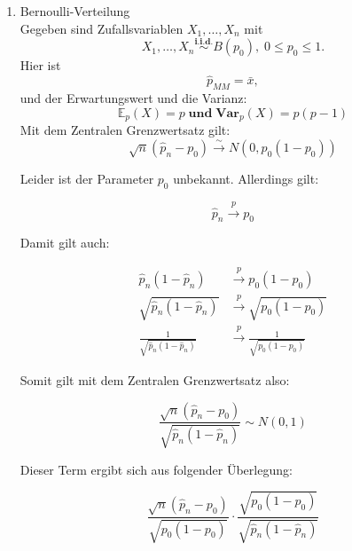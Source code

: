 \documentclass[10pt]{article}
\newcommand{\FZV}{X_1, \ldots, X_n} %
\newcommand{\EW}{\mathbb{E}} %
\newcommand{\KW}{\overset{p} \longrightarrow} %
\newcommand{\KV}{\overset{\sim} \longrightarrow} %
\newenvironment{BSP}[1][]
{\begin{Beispiel}[frametitle=#1]}{\end{Beispiel}}
\begin{document}
	\begin{BSP}[Beispiel 1.3.4 (Schätzfehlerverteilung MM-Schätzer)]
			\begin{enumerate}[label = (\roman*)]
			\item Bernoulli-Verteilung\\
			Gegeben sind Zufallsvariablen $\FZV$ mit
			\begin{equation*}
				\FZV \overset{\textbf{i.i.d.}}{\sim} B(p_0), \; 0 \leq p_0 \leq 1.
			\end{equation*} 
			Hier ist
			\begin{equation*}
				\hat{p}_{MM} = \bar{x},
			\end{equation*}
			und der Erwartungswert und die Varianz:
			\begin{equation*}
				\EW_p(X)=p \; \textbf{und} \; 	\textbf{Var}_p(X) = p(p-1)
			\end{equation*}
			Mit dem Zentralen Grenzwertsatz gilt:
			\begin{equation*}
				\sqrt{n}(\hat{p}_n - p_0) \KV N(0,p_0(1-p_0))
			\end{equation*}
			
			Leider ist der Parameter $p_0$ unbekannt. Allerdings gilt:
			
			\begin{equation*}
				\hat{p}_n \KW p_0
			\end{equation*}
			
			Damit gilt auch:
			
			\begin{equation*}
				\begin{split}
					\hat{p}_n (1-\hat{p}_n) &\KW p_0(1-p_0) \\
					\sqrt{\hat{p}_n (1-\hat{p}_n)} &\KW \sqrt{p_0(1-p_0)} \\
					\frac{1}{\sqrt{\hat{p}_n (1-\hat{p}_n)}} &\KW \frac{1}{\sqrt{p_0(1-p_0)}}
				\end{split}
			\end{equation*}
			
			Somit gilt mit dem Zentralen Grenzwertsatz also:
			
			\begin{equation*}
				\frac{\sqrt{n} (\hat{p}_n - p_0)}{\sqrt{\hat{p}_n (1-\hat{p}_n)}} \sim N(0,1)
			\end{equation*}
			
			Dieser Term ergibt sich aus folgender Überlegung:
			
			\begin{equation*}
				\frac{\sqrt{n} (\hat{p}_n - p_0)}{\sqrt{p_0 (1-p_0)}} \cdot \frac{\sqrt{p_0(1-p_0)}}{\sqrt{\hat{p}_n (1-\hat{p}_n)}}
			\end{equation*}
			

\end{enumerate}
\end{BSP}
\end{document}
